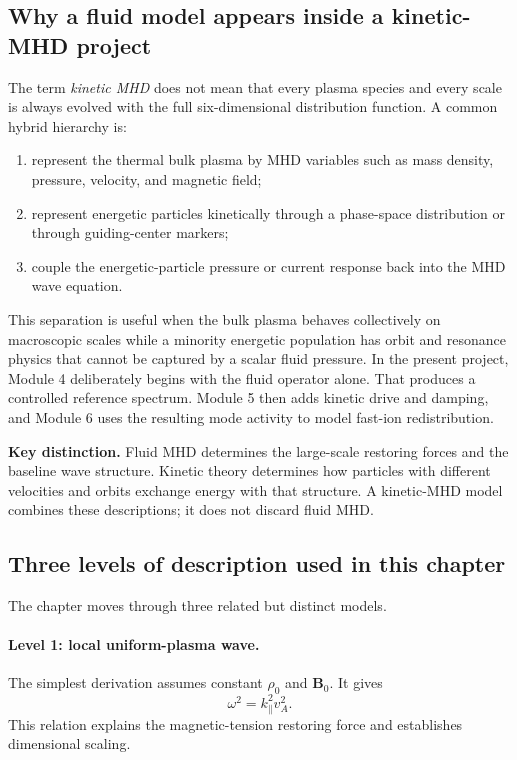 \subsection{Why a fluid model appears inside a kinetic-MHD project}
The term \emph{kinetic MHD} does not mean that every plasma species and every scale is always evolved with the full six-dimensional distribution function. A common hybrid hierarchy is:
\begin{enumerate}[leftmargin=1.6em]
\item represent the thermal bulk plasma by MHD variables such as mass density, pressure, velocity, and magnetic field;
\item represent energetic particles kinetically through a phase-space distribution or through guiding-center markers;
\item couple the energetic-particle pressure or current response back into the MHD wave equation.
\end{enumerate}
This separation is useful when the bulk plasma behaves collectively on macroscopic scales while a minority energetic population has orbit and resonance physics that cannot be captured by a scalar fluid pressure. In the present project, Module 4 deliberately begins with the fluid operator alone. That produces a controlled reference spectrum. Module 5 then adds kinetic drive and damping, and Module 6 uses the resulting mode activity to model fast-ion redistribution.

\begin{physicsbox}
\textbf{Key distinction.} Fluid MHD determines the large-scale restoring forces and the baseline wave structure. Kinetic theory determines how particles with different velocities and orbits exchange energy with that structure. A kinetic-MHD model combines these descriptions; it does not discard fluid MHD.
\end{physicsbox}

\subsection{Three levels of description used in this chapter}
The chapter moves through three related but distinct models.

\paragraph{Level 1: local uniform-plasma wave.}
The simplest derivation assumes constant $\rho_0$ and $\mathbf B_0$. It gives
\begin{equation}
\omega^2=k_\parallel^2v_A^2.
\end{equation}
This relation explains the magnetic-tension restoring force and establishes dimensional scaling.

